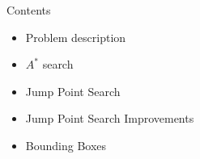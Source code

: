 \documentclass{presentation}
\begin{document}
\begin{frame}
    \titlepage
\end{frame}

\begin{frame}{Contents}
    \begin{itemize}
        \item Problem description
        \item $A^*$ search
        \item Jump Point Search
        \item Jump Point Search Improvements
        \item Bounding Boxes
    \end{itemize}
\end{frame}



\begin{frame}
\end{frame}



\begin{frame}
\end{frame}


\begin{frame}
\end{frame}


\begin{frame}
\end{frame}



\begin{frame}
\end{frame}


\begin{frame}
\end{frame}
\end{document}
